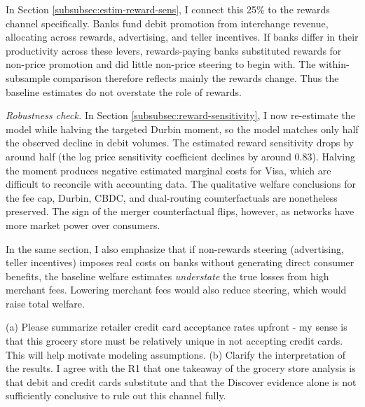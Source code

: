 \documentclass[main.tex]{subfiles}
\begin{document}
\begin{refsection}
In Section \ref{subsubsec:estim-reward-sens}, I connect this 25\% to the rewards channel specifically.
Banks fund debit promotion from interchange revenue, allocating across rewards, advertising, and teller incentives.
If banks differ in their productivity across these levers, rewards-paying banks substituted rewards for non-price promotion and did little non-price steering to begin with.
The within-subsample comparison therefore reflects mainly the rewards change.
Thus the baseline estimates do not overstate the role of rewards.

\emph{Robustness check.}
In Section \ref{subsubsec:reward-sensitivity}, I now re-estimate the model while halving the targeted Durbin moment, so the model matches only half the observed decline in debit volumes.
The estimated reward sensitivity drops by around half (the log price sensitivity coefficient declines by around 0.83).
Halving the moment produces negative estimated marginal costs for Visa, which are difficult to reconcile with accounting data.
The qualitative welfare conclusions for the fee cap, Durbin, CBDC, and dual-routing counterfactuals are nonetheless preserved.
The sign of the merger counterfactual flips, however, as networks have more market power over consumers.

In the same section, I also emphasize that if non-rewards steering (advertising, teller incentives) imposes real costs on banks without generating direct consumer benefits, the baseline welfare estimates \emph{understate} the true losses from high merchant fees. Lowering merchant fees would also reduce steering, which would raise total welfare.

\begin{refcommentnoclear}
(a) Please summarize retailer credit card acceptance rates upfront - my sense is that this grocery store must be relatively unique in not accepting credit cards.
This will help motivate modeling assumptions.
(b) Clarify the interpretation of the results.
I agree with the R1 that one takeaway of the grocery store analysis is that debit and credit cards substitute and that the Discover evidence alone is not sufficiently conclusive to rule out this channel fully.

\end{refcommentnoclear}


\end{refsection}
\end{document}

